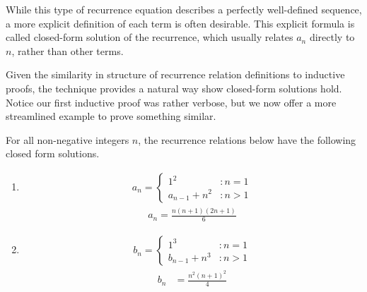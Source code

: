 \documentclass[twoside]{report}
\begin{document}
While this type of recurrence equation describes a perfectly well-defined sequence, a more explicit definition of each term is often desirable. This explicit formula is called closed-form solution of the recurrence, which usually relates $a_n$ directly to $n$, rather than other terms.

Given the similarity in structure of recurrence relation definitions to inductive proofs, the technique provides a natural way show closed-form solutions hold. Notice our first inductive proof was rather verbose, but we now offer a more streamlined example to prove something similar.

\vspace{\baselineskip}
\begin{theorem}
	For all non-negative integers $n$, the recurrence relations below have the following closed form solutions.
	
	\begin{enumerate}
		\item 
		\begin{align*}
		a_n =
		\begin{cases}
			1^2 &: n = 1 \\
			a_{n - 1} + n^2 &: n > 1
		\end{cases}
		\end{align*}
		\begin{align}
			a_n = \frac{n(n + 1)(2n + 1)}{6}
		\end{align}
		\item 
		\begin{align*}
			b_n =
			\begin{cases}
				1^3 &: n = 1 \\
				b_{n - 1} + n^3 &: n > 1
			\end{cases}
		\end{align*}
		\begin{align}
			b_n &= \frac{n^2(n + 1)^2}{4}
		\end{align}
	\end{enumerate}
\end{theorem}
\end{document}
